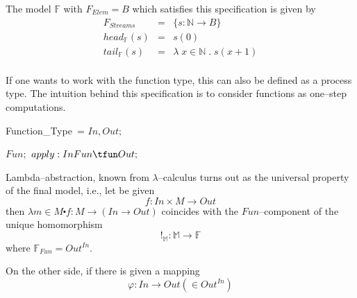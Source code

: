 \documentclass[landscape, autoslides, light]{mmiss}
\begin{document}
\begin{Package}[Label={FSDPT}, Title={Formal Specification of Data and Process Types}, ShortTitle={FSDPT}, Authors={Horst Reichel}, Date={February 2003}, LevelOfDetail=Lecture, Language=en-GB]
\begin{Section}[Title={Final Coalgebras as Process Types}, Label={section4}]
\begin{Section}[Title={Examples of Process Types}, Label={section4_2}]
\begin{Paragraph}[Title={Streams}, Label=Paragraph103]
\end{Paragraph}
\begin{Paragraph}[Title={Streams}, Label=Paragraph104]

The model $\mathbb{F}$ with $F_{Elem} = B$ which satisfies this
specification is given by $$ \begin{array}{lll} F_{Streams} & = &
\{ s : \mathbb{N} \to B \} \\ head_{\mathbb{F}}(s) & = & s(0) \\
tail_{\mathbb{F}}(s)& = & \lambda \; x \in \mathbb{N} \;. \;
s(x+1) \\ \end{array}$$

\end{Paragraph}
\begin{Paragraph}[Title={Function Type}, Label=Paragraph105]

If one wants to work with the function type, this can also be
defined as a process type. The intuition behind this specification
is to consider functions as one--step computations.

\begin{SpecDefn}{Function\_Type}~=
\I\Sort \( In, Out; \) \item[\Then] \item[\Cofree~\Group]
\begin{Items}
\I\Sort \( Fun; \) \I\Ops \( apply : In \* Fun \tfun Out;\)
 ~\EndGroup \end{Items}  \item[\End]
\end{SpecDefn}

\end{Paragraph}
\begin{Paragraph}[Title={Function Type}, Label=Paragraph106]

Lambda--abstraction, known from $\lambda$--calculus turns out as
the universal property of the final model, i.e., let be given
$$ f : In \times M \to Out$$
then $ \lambda m \in M \centerdot f : M \to (In \to Out)$
coincides with the $Fun$--component of the unique homomorphism
$$!_{\mathbb{M}} : \mathbb{M} \to \mathbb{F}$$
where $\mathbb{F}_{Fun} = Out^{In}$.

\end{Paragraph}
\begin{Paragraph}[Title={Function Type}, Label=Paragraph107]

On the other side, if there is given a mapping $$\varphi : In \to
Out ( \in Out^{In})$$ \pause


\end{Paragraph}
\end{Section}
\end{Section}
\end{Package}
\end{document}
